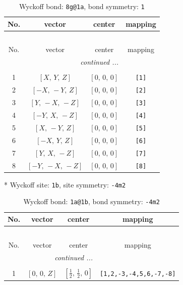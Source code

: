 \documentclass[fleqn,8pt]{jsarticle}
\begin{document}
\renewcommand{\arraystretch}{1.2}
\begin{longtable}{cccc}
\caption{Wyckoff bond: {\tt 8g@1a}, bond symmetry: {\tt 1}}
 \\
 \hline \hline
No. & vector & center & mapping \\ \hline \endfirsthead

\multicolumn{3}{l}{\tablename\ \thetable{}} \\
 \hline \hline
No. & vector & center & mapping \\ \hline \endhead

 \hline \hline
\multicolumn{3}{r}{\footnotesize\it continued ...} \\ \endfoot

 \hline \hline
\multicolumn{3}{r}{} \\ \endlastfoot

1 & $\left[ X,\, Y,\, Z \right]$ & $\left[ 0,\, 0,\, 0 \right]$ & {\tt [1]} \\ \hline
2 & $\left[ - X,\, - Y,\, Z \right]$ & $\left[ 0,\, 0,\, 0 \right]$ & {\tt [2]} \\ \hline
3 & $\left[ Y,\, - X,\, - Z \right]$ & $\left[ 0,\, 0,\, 0 \right]$ & {\tt [3]} \\ \hline
4 & $\left[ - Y,\, X,\, - Z \right]$ & $\left[ 0,\, 0,\, 0 \right]$ & {\tt [4]} \\ \hline
5 & $\left[ X,\, - Y,\, Z \right]$ & $\left[ 0,\, 0,\, 0 \right]$ & {\tt [5]} \\ \hline
6 & $\left[ - X,\, Y,\, Z \right]$ & $\left[ 0,\, 0,\, 0 \right]$ & {\tt [6]} \\ \hline
7 & $\left[ Y,\, X,\, - Z \right]$ & $\left[ 0,\, 0,\, 0 \right]$ & {\tt [7]} \\ \hline
8 & $\left[ - Y,\, - X,\, - Z \right]$ & $\left[ 0,\, 0,\, 0 \right]$ & {\tt [8]} \\
\end{longtable}
* Wyckoff site: {\tt 1b}, site symmetry: {\tt -4m2}
\renewcommand{\arraystretch}{1.2}
\begin{longtable}{cccc}
\caption{Wyckoff bond: {\tt 1a@1b}, bond symmetry: {\tt -4m2}}
 \\
 \hline \hline
No. & vector & center & mapping \\ \hline \endfirsthead

\multicolumn{3}{l}{\tablename\ \thetable{}} \\
 \hline \hline
No. & vector & center & mapping \\ \hline \endhead

 \hline \hline
\multicolumn{3}{r}{\footnotesize\it continued ...} \\ \endfoot

 \hline \hline
\multicolumn{3}{r}{} \\ \endlastfoot

1 & $\left[ 0,\, 0,\, Z \right]$ & $\left[ \frac{1}{2},\, \frac{1}{2},\, 0 \right]$ & {\tt [1,2,-3,-4,5,6,-7,-8]} \\
\end{longtable}
\end{document}
